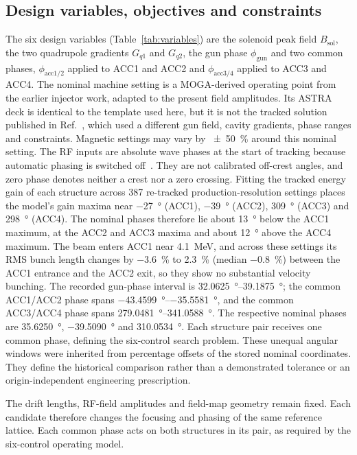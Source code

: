 \documentclass[aps,prab,reprint,superscriptaddress,amsmath,amssymb,floatfix]{revtex4-2}
\begin{document}
\subsection{Design variables, objectives and constraints}
The six design variables (Table~\ref{tab:variables}) are the solenoid peak field $B_\mathrm{sol}$,
the two quadrupole gradients $G_{q1}$ and $G_{q2}$, the gun phase $\phi_\mathrm{gun}$ and two
common phases, $\phi_\mathrm{acc1/2}$ applied to ACC1 and ACC2 and $\phi_\mathrm{acc3/4}$ applied to
ACC3 and ACC4. The nominal machine setting is a MOGA-derived operating point from the earlier
injector work, adapted to the present field amplitudes. Its ASTRA deck is identical to the
template used here, but it is not the tracked solution published in
Ref.~\cite{Kim2024KLSMOGA}, which used a different gun field, cavity gradients, phase ranges
and constraints. Magnetic settings may vary by \SI{\pm50}{\percent} around this
nominal setting. The RF inputs are absolute wave phases at the start of tracking because automatic phasing is
switched off~\cite{Floettmann2017Astra}. They are not calibrated off-crest angles, and zero phase
denotes neither a crest nor a zero crossing. Fitting the tracked energy gain of each structure across 387
re-tracked production-resolution settings places the model's gain maxima near \SI{-27}{\degree} (ACC1),
\SI{-39}{\degree} (ACC2), \SI{309}{\degree} (ACC3) and \SI{298}{\degree} (ACC4). The nominal phases therefore lie
about \SI{13}{\degree} below the ACC1 maximum, at the ACC2 and ACC3 maxima and about \SI{12}{\degree} above the
ACC4 maximum. The beam enters ACC1 near \SI{4.1}{\mega\electronvolt}, and across these settings its RMS bunch
length changes by \SI{-3.6}{\percent} to \SI{+2.3}{\percent} (median \SI{-0.8}{\percent}) between the ACC1 entrance
and the ACC2 exit, so they show no substantial velocity bunching. The recorded
gun-phase interval is \SIrange{32.0625}{39.1875}{\degree}; the common ACC1/ACC2 phase spans
\SIrange{-43.4599}{-35.5581}{\degree}, and the common ACC3/ACC4 phase spans
\SIrange{279.0481}{341.0588}{\degree}. The respective nominal phases are
\SI{35.6250}{\degree}, \SI{-39.5090}{\degree} and \SI{310.0534}{\degree}.
Each structure pair receives one common phase, defining the six-control search problem.
These unequal angular windows were inherited from percentage offsets of the stored nominal
coordinates. They define the historical comparison rather than a demonstrated tolerance or an
origin-independent engineering prescription.

The drift lengths, RF-field amplitudes and field-map geometry remain fixed. Each candidate
therefore changes the focusing and phasing of the same reference lattice. Each common phase acts
on both structures in its pair, as required by the six-control operating model.
\end{document}
